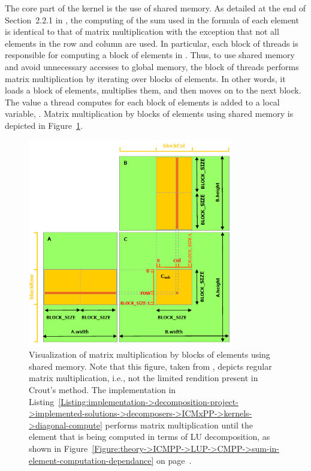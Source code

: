 The core part of the kernel is the use of shared memory. As detailed at the end of Section~2.2.1 in  \cite{Cejka2022}, the computing of the sum used in the formula of each element is identical to that of matrix multiplication with the exception that not all elements in the row and column are used. In particular, each block of threads is responsible for computing a block of elements in . Thus, to use shared memory and avoid unnecessary accesses to global memory, the block of threads performs matrix multiplication by iterating over blocks of elements. In other words, it loads a block of elements, multiplies them, and then moves on to the next block. The value a thread computes for each block of elements is added to a local variable, . Matrix multiplication by blocks of elements using shared memory is depicted in Figure~\ref{Figure:implementation->decomposition-project->implemented-solutions->decomposers->ICMxPP->CUDA-matrix-multiplication-with-shared-memory}.

\begin{figure}[ht!]
	\centering
	\includegraphics[width=0.8\textwidth, keepaspectratio]{images/ch02/CUDA-matrix-multiplication-by-blocks-using-shared-memory.png}
	\caption{Visualization of matrix multiplication by blocks of elements using shared memory. Note that this figure, taken from  \cite{NVIDIADecember2022}, depicts regular matrix multiplication, i.e., not the limited rendition present in Crout's method. The implementation in Listing~\ref{Listing:implementation->decomposition-project->implemented-solutions->decomposers->ICMxPP->kernels->diagonal-compute} performs matrix multiplication until the element that is being computed in terms of LU decomposition, as shown in Figure~\ref{Figure:theory->ICMPP->LUP->CMPP->sum-in-element-computation-dependance} on page~\pageref{Figure:theory->ICMPP->LUP->CMPP->sum-in-element-computation-dependance}.}
	\label{Figure:implementation->decomposition-project->implemented-solutions->decomposers->ICMxPP->CUDA-matrix-multiplication-with-shared-memory}
\end{figure}

